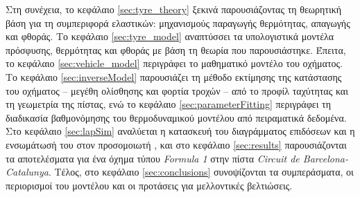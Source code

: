 Στη συνέχεια, το κεφάλαιο \ref{sec:tyre_theory} ξεκινά παρουσιάζοντας τη θεωρητική βάση για τη
συμπεριφορά ελαστικών: μηχανισμούς παραγωγής θερμότητας, απαγωγής και φθοράς. Το
κεφάλαιο \ref{sec:tyre_model} αναπτύσσει τα υπολογιστικά μοντέλα πρόσφυσης, θερμότητας και
φθοράς με βάση τη θεωρία που παρουσιάστηκε. Έπειτα, το κεφάλαιο \ref{sec:vehicle_model} περιγράφει
το μαθηματικό μοντέλο του οχήματος. Το κεφάλαιο \ref{sec:inverseModel} παρουσιάζει τη μέθοδο εκτίμησης
της κατάστασης του οχήματος -- μεγέθη ολίσθησης και φορτία τροχών -- από το προφίλ ταχύτητας και τη
γεωμετρία της πίστας, ενώ το κεφάλαιο \ref{sec:parameterFitting} περιγράφει τη διαδικασία βαθμονόμησης
του θερμοδυναμικού μοντέλου από πειραματικά δεδομένα. Στο κεφάλαιο \ref{sec:lapSim} αναλύεται η
κατασκευή του διαγράμματος επιδόσεων και η ενσωμάτωσή του στον προσομοιωτή \openLap, και στο
κεφάλαιο \ref{sec:results} παρουσιάζονται τα αποτελέσματα για ένα όχημα τύπου \textit{Formula 1} στην
πίστα \textit{Circuit de Barcelona-Catalunya}. Τέλος, στο κεφάλαιο \ref{sec:conclusions} συνοψίζονται
τα συμπεράσματα, οι περιορισμοί του μοντέλου και οι προτάσεις για μελλοντικές βελτιώσεις.
